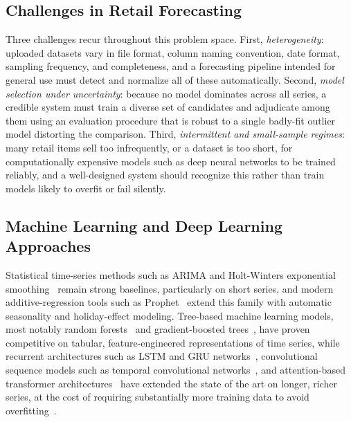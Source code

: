 \subsection{Challenges in Retail Forecasting}
Three challenges recur throughout this problem space. First, \emph{heterogeneity}: uploaded datasets vary in file format, column naming convention, date format, sampling frequency, and completeness, and a forecasting pipeline intended for general use must detect and normalize all of these automatically. Second, \emph{model selection under uncertainty}: because no model dominates across all series, a credible system must train a diverse set of candidates and adjudicate among them using an evaluation procedure that is robust to a single badly-fit outlier model distorting the comparison. Third, \emph{intermittent and small-sample regimes}: many retail items sell too infrequently, or a dataset is too short, for computationally expensive models such as deep neural networks to be trained reliably, and a well-designed system should recognize this rather than train models likely to overfit or fail silently.

\subsection{Machine Learning and Deep Learning Approaches}
Statistical time-series methods such as ARIMA and Holt-Winters exponential smoothing~\cite{boxjenkins1970,winters1960holtwinters} remain strong baselines, particularly on short series, and modern additive-regression tools such as Prophet~\cite{taylor2018prophet} extend this family with automatic seasonality and holiday-effect modeling. Tree-based machine learning models, most notably random forests~\cite{breiman2001randomforest} and gradient-boosted trees~\cite{chen2016xgboost}, have proven competitive on tabular, feature-engineered representations of time series, while recurrent architectures such as LSTM and GRU networks~\cite{hochreiter1997lstm,cho2014gru}, convolutional sequence models such as temporal convolutional networks~\cite{bai2018tcn}, and attention-based transformer architectures~\cite{vaswani2017attention} have extended the state of the art on longer, richer series, at the cost of requiring substantially more training data to avoid overfitting~\cite{lim2021survey}.

